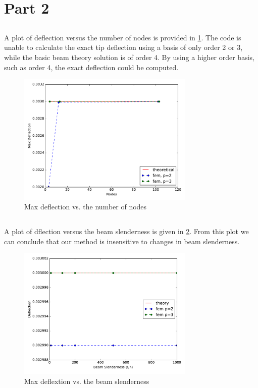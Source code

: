 \documentclass{article}
\begin{document}
\section{Part 2}

\subsection{}
A plot of deflection versus the number of nodes is provided in \cref{fig:21}. The code is unable to calculate the exact tip deflection using a basis of only order 2 or 3, while the basic beam theory solution is of order 4. By using a higher order basis, such as order 4, the exact deflection could be computed.
\begin{figure}[ht]
	\centering
	\includegraphics[width=0.75\textwidth]{max_deflection_vs_n}
	\caption{Max deflection vs. the number of nodes}
	\label{fig:21}
\end{figure}

\subsection{}
A plot of dflection versus the beam slenderness is given in \cref{fig:22}. From this plot we can conclude that our method is insensitive to changes in beam slenderness.
\begin{figure}[ht]
	\centering
	\includegraphics[width=0.75\textwidth, trim={0cm, 0cm, 0cm, 0cm}]{max_deflection_vs_h}
	\caption{Max deflextion vs. the beam slenderness}
	\label{fig:22}
\end{figure}
\end{document}
